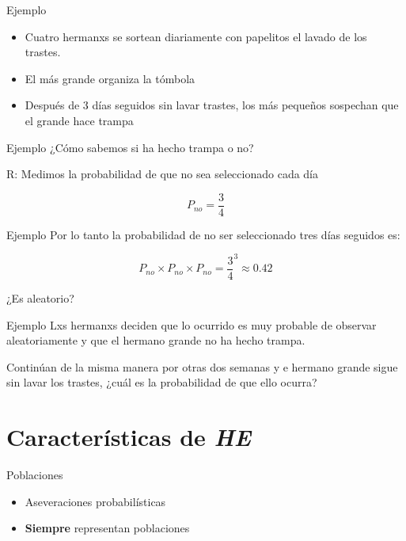 \documentclass[
  11pt,
  ignorenonframetext,
]{beamer}
\begin{document}
\begin{frame}{Ejemplo}
\protect\hypertarget{ejemplo}{}
\begin{itemize}
\item
  Cuatro hermanxs se sortean diariamente con papelitos el lavado de los
  trastes.
\item
  El más grande organiza la tómbola
\item
  Después de 3 días seguidos sin lavar trastes, los más pequeños
  sospechan que el grande hace trampa
\end{itemize}
\end{frame}

\begin{frame}{Ejemplo}
\protect\hypertarget{ejemplo-1}{}
¿Cómo sabemos si ha hecho trampa o no?

R: Medimos la probabilidad de que no sea seleccionado cada día

\[P_{no} = \frac{3}{4}\]
\end{frame}

\begin{frame}{Ejemplo}
\protect\hypertarget{ejemplo-2}{}
Por lo tanto la probabilidad de no ser seleccionado tres días seguidos
es:

\[P_{no} \times P_{no} \times P_{no} = \frac{3}{4}^3 \approx 0.42\]

¿Es aleatorio?
\end{frame}

\begin{frame}{Ejemplo}
\protect\hypertarget{ejemplo-3}{}
Lxs hermanxs deciden que lo ocurrido es muy probable de observar
aleatoriamente y que el hermano grande no ha hecho trampa.

Continúan de la misma manera por otras dos semanas y e hermano grande
sigue sin lavar los trastes, ¿cuál es la probabilidad de que ello
ocurra?
\end{frame}

\hypertarget{caracteruxedsticas-de-he}{%
\section{\texorpdfstring{Características de
\emph{HE}}{Características de HE}}\label{caracteruxedsticas-de-he}}

\begin{frame}{Poblaciones}
\protect\hypertarget{poblaciones}{}
\begin{itemize}
\item
  Aseveraciones probabilísticas
\item
  \textbf{Siempre} representan poblaciones
\end{itemize}
\end{frame}
\end{document}
